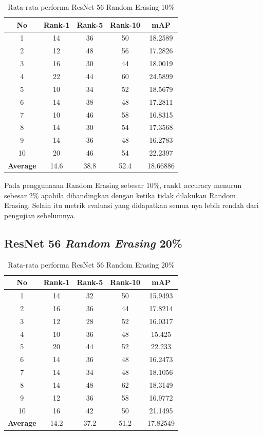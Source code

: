 \begin{longtable}{|c|c|c|c|c|}
	\caption{Rata-rata performa ResNet 56 Random Erasing 10\%}
	\label{tabel: 31}\\
	\hline
	\rowcolor[HTML]{C0C0C0}
	\textbf{No} &\textbf{Rank-1} & \textbf{Rank-5} & \textbf{Rank-10} & \textbf{mAP} \\
	\hline
	1 &14 &36 &50 &18.2589 \\
	2 &12 &48 &56 &17.2826 \\
	3 &16 &30 &44 &18.0019 \\
	4 &22 &44 &60 &24.5899 \\
	5 &10 &34 &52 &18.5679 \\
	6 &14 &38 &48 &17.2811 \\
	7 &10 &46 &58 &16.8315 \\
	8 &14 &30 &54 &17.3568 \\
	9 &14 &36 &48 &16.2783 \\
	10 &20 &46 &54 &22.2397 \\
	\hline
	\textbf{Average} & 14.6 & 38.8 & 52.4 &18.66886 \\
	\hline
\end{longtable}
\vspace{-1ex}
Pada penggunaaan Random Erasing sebesar 10\%, rank1 accuracy menurun sebesar 2\% apabila dibandingkan dengan ketika tidak dilakukan Random Erasing. Selain itu metrik evaluasi yang didapatkan semua nya lebih rendah dari pengujian sebelumnya. 
\subsection{ResNet 56 \textit{Random Erasing} 20\%}
\begin{longtable}{|c|c|c|c|c|}
	\caption{Rata-rata performa ResNet 56 Random Erasing 20\%}
	\label{tabel: 32}\\
	\hline
	\rowcolor[HTML]{C0C0C0}
	\textbf{No} &\textbf{Rank-1} & \textbf{Rank-5} & \textbf{Rank-10} & \textbf{mAP} \\
	\hline
	1 &14 &32 &50 &15.9493 \\
	2 &16 &36 &44 &17.8214 \\
	3 &12 &28 &52 &16.0317 \\
	4 &10 &36 &48 &15.425 \\
	5 &20 &44 &52 &22.233 \\
	6 &14 &36 &48 &16.2473 \\
	7 &14 &34 &48 &18.1056 \\
	8 &14 &48 &62 &18.3149 \\
	9 &12 &36 &58 &16.9772 \\
	10 &16 &42 &50 &21.1495 \\
	\hline
	\textbf{Average} & 14.2 & 37.2 & 51.2 &17.82549 \\
	\hline
\end{longtable}

